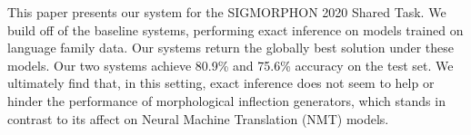 This paper presents our system for the SIGMORPHON 2020 Shared Task. We build off of the baseline systems, performing exact inference on models trained on language family data. Our systems return the globally best solution under these models. Our two systems achieve 80.9\% and 75.6\% accuracy on the test set. We ultimately find that, in this setting, exact inference does not seem to help or hinder the performance of morphological inflection generators, which stands in contrast to its affect on Neural Machine Translation (NMT) models.
